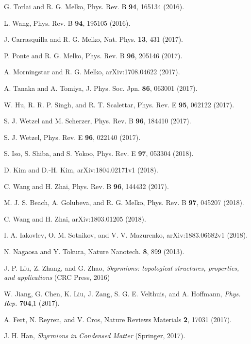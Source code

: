 \documentclass[reprint,amsmath,amssymb,aps,showpacs,superscriptaddress,prl]{revtex4-1}
\begin{document}
\begin{thebibliography}{99}

 G. Torlai and R. G. Melko, Phys. Rev. B {\bf 94}, 165134 (2016).

 L. Wang, Phys. Rev. B {\bf 94}, 195105 (2016).

 J. Carrasquilla and R. G. Melko, Nat. Phys. {\bf 13}, 431 (2017).

 P. Ponte and R. G. Melko, Phys. Rev. B {\bf 96}, 205146 (2017).

 A. Morningstar and R. G. Melko, arXiv:1708.04622 (2017).

 A. Tanaka and A. Tomiya, J. Phys. Soc. Jpn. {\bf 86}, 063001 (2017).

 W. Hu, R. R. P. Singh, and R. T. Scalettar, Phys. Rev. E {\bf 95}, 062122 (2017).

 S. J. Wetzel and M. Scherzer, Phys. Rev. B {\bf 96}, 184410 (2017).

 S. J. Wetzel, Phys. Rev. E {\bf 96}, 022140 (2017).

 S. Iso, S. Shiba, and S. Yokoo, Phys. Rev. E {\bf 97}, 053304 (2018).

 D. Kim and D.-H. Kim, arXiv:1804.02171v1 (2018).

 C. Wang and H. Zhai, Phys. Rev. B {\bf 96}, 144432 (2017).

 M. J. S. Beach, A. Golubeva, and R. G. Melko, Phys. Rev. B {\bf 97}, 045207 (2018).

 C. Wang and H. Zhai, arXiv:1803.01205 (2018).

 I. A. Iakovlev, O. M. Sotnikov, and V. V. Mazurenko, arXiv:1883.06682v1 (2018).

 N. Nagaosa and Y. Tokura, Nature Nanotech. {\bf 8}, 899 (2013).

 J. P. Liu, Z. Zhang, and G. Zhao, {\it Skyrmions: topological structures, properties, and applications} (CRC Press, 2016)

 W. Jiang, G. Chen, K. Liu, J. Zang, S. G. E. Velthuis, and A. Hoffmann, {\it Phys. Rep.}
{\bf 704},1 (2017).

 A. Fert, N. Reyren, and V. Cros, Nature Reviews Materials {\bf 2}, 17031 (2017).

 J. H. Han, {\it Skyrmions in Condensed Matter}  (Springer, 2017).


\end{thebibliography}
\end{document}
